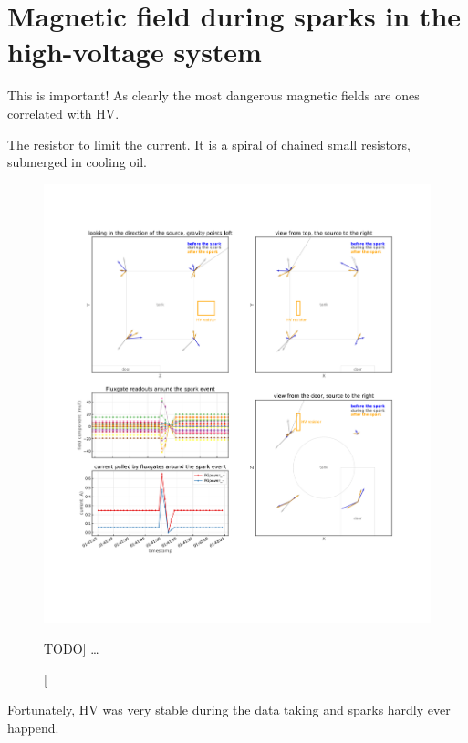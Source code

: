 

\chapter{Magnetic field during sparks in the high-voltage system}


This is important! As clearly the most dangerous magnetic fields are ones correlated with HV.

The resistor to limit the current. It is a spiral of chained small resistors, submerged in cooling oil.

\begin{figure}
  \centering
  \includegraphics[width=\linewidth]{gfx/nEDM_SFC/SFC_during_spark_event_thesis.pdf}
  \caption
  [TODO]
  {\ldots}
  \label{fig:field_when_sparking}
\end{figure}


Fortunately, HV was very stable during the data taking and sparks hardly ever happend.











